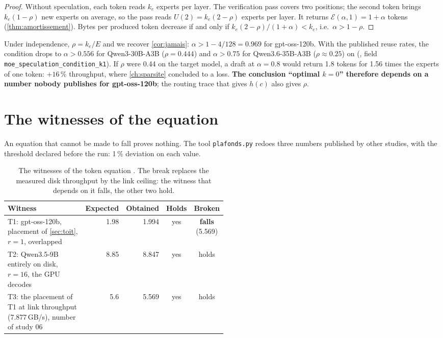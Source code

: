 \begin{proof}
Without speculation, each token reads $k_e$ experts per layer. The verification pass covers two positions; the second token brings $k_e(1-\rho)$ new experts on average, so the pass reads $U(2) = k_e(2-\rho)$ experts per layer. It returns $\mathcal E(\alpha,1) = 1 + \alpha$ tokens (\cref{thm:amortissement}). Bytes per produced token decrease if and only if $k_e(2-\rho)/(1+\alpha) < k_e$, i.e.\ $\alpha > 1 - \rho$.
\end{proof}

Under independence, $\rho = k_e/E$ and we recover \cref{cor:jamais}: $\alpha > 1 - 4/128 = 0.969$ for gpt-oss-120b. With the published reuse rates, the condition drops to $\alpha > 0.556$ for Qwen3-30B-A3B ($\rho = 0.444$) and $\alpha > 0.75$ for Qwen3.6-35B-A3B ($\rho \approx 0.25$) \calc{} on \litt{} (, field \texttt{moe\_speculation\_condition\_k1}). If $\rho$ were 0.44 on the target model, a draft at $\alpha = 0.8$ would return 1.8 tokens for 1.56 times the experts of one token: $+16\,\%$ throughput, where \cref{ch:sparsite} concluded to a loss. \textbf{The conclusion ``optimal $k = 0$'' therefore depends on a number nobody publishes for gpt-oss-120b}; the routing trace that gives $h(c)$ also gives $\rho$.

\section{The witnesses of the equation}\label{sec:temoins-equation}

An equation that cannot be made to fall proves nothing. The tool \texttt{plafonds.py} redoes three numbers published by other studies, with the threshold declared before the run: 1\,\% deviation on each value.

\begin{table}[ht]
\centering\small
\caption[The witnesses of the token equation]{The witnesses of the token equation \calc. The break replaces the measured disk throughput by the link ceiling: the witness that depends on it falls, the other two hold.}
\label{tab:temoins-equation}
\begin{tabular}{@{}p{0.5\linewidth}rrcc@{}}
\toprule
Witness & Expected & Obtained & Holds & Broken \\
\midrule
T1: gpt-oss-120b, placement of \cref{sec:toit}, $r = 1$, overlapped & 1.98 & 1.994 & yes & \textbf{falls} (5.569) \\
T2: Qwen3.5-9B entirely on disk, $r = 16$, the GPU decodes & 8.85 & 8.847 & yes & holds \\
T3: the placement of T1 at link throughput (7.877\,GB/s), number of study 06 & 5.6 & 5.569 & yes & holds \\
\bottomrule
\end{tabular}
\end{table}

